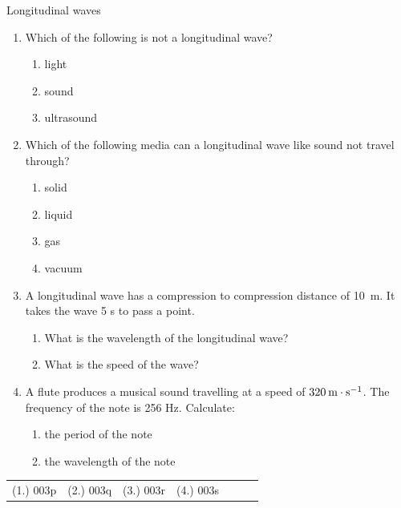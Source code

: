 \begin{eocexercises}{Longitudinal waves}
            \noindent\vspace{-1cm}
      \label{m38783*id293753}\begin{enumerate}[noitemsep, label=\textbf{\arabic*}. ] 
            \label{m38783*uid27}\item Which of the following is not a longitudinal wave?
\label{m38783*id293768}\begin{enumerate}[noitemsep, label=\textbf{\alph*}. ] 
\label{m38783*uid29}\item light
\label{m38783*uid30}\item sound
\label{m38783*uid31}\item ultrasound
\end{enumerate}
                \label{m38783*uid32}\item Which of the following media can a longitudinal wave like sound not travel through?
\label{m38783*id293834}\begin{enumerate}[noitemsep, label=\textbf{\alph*}. ] 
            \label{m38783*uid33}\item solid
\label{m38783*uid34}\item liquid
\label{m38783*uid35}\item gas
\label{m38783*uid36}\item vacuum
\end{enumerate}
                
    \par
          \label{m38783*uid38}\item A longitudinal wave has a compression to compression distance of 10~m. It takes the wave 5 s to pass a point.
\label{m38783*id294078}\begin{enumerate}[noitemsep, label=\textbf{\alph*}. ] 
            \label{m38783*uid39}\item What is the wavelength of the longitudinal wave?
\label{m38783*uid40}\item What is the speed of the wave?
\end{enumerate}
                \label{m38783*uid41}\item A flute produces a musical sound travelling at a speed of $320\phantom{\rule{2pt}{0ex}}\text{m}\ensuremath{\cdot}\text{s}{}^{-1}$. The frequency of the note is 256 Hz. Calculate:
\label{m38783*id294137}\begin{enumerate}[noitemsep, label=\textbf{\alph*}. ] 
            \label{m38783*uid42}\item the period of the note
\label{m38783*uid43}\item the wavelength of the note
\end{enumerate}
                \end{enumerate}
  \label{m38783**end}
  \label{e91550bed2a1600e0ddb2572d580bf8e**end}
\par \practiceinfo
 \par \begin{tabular}[h]{cccccc}
 (1.) 003p  &  (2.) 003q  &  (3.) 003r  &  (4.) 003s  &    &    &    & \end{tabular}
\end{eocexercises}

